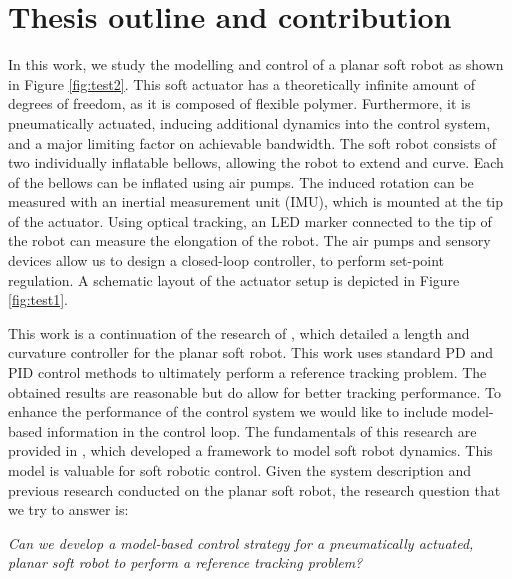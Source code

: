 \section*{Thesis outline and contribution}

In this work, we study the modelling and control of a planar soft robot as shown in Figure \ref{fig:test2}. This soft actuator has a theoretically infinite amount of degrees of freedom, as it is composed of flexible polymer. Furthermore, it is pneumatically actuated, inducing additional dynamics into the control system, and a major limiting factor on achievable bandwidth. The soft robot consists of two individually inflatable bellows, allowing the robot to extend and curve. Each of the bellows can be inflated using air pumps. The induced rotation can be measured with an inertial measurement unit (IMU), which is mounted at the tip of the actuator. Using optical tracking, an LED marker connected to the tip of the robot can measure the elongation of the robot. The air pumps and sensory devices allow us to design a closed-loop controller, to perform set-point regulation. A schematic layout of the actuator setup is depicted in Figure \ref{fig:test1}.

This work is a continuation of the research of \cite{berkers}, which detailed a length and curvature controller for the planar soft robot. This work uses standard PD and PID control methods to ultimately perform a reference tracking problem. The obtained results are reasonable but do allow for better tracking performance. To enhance the performance of the control system we would like to include model-based information in the control loop. The fundamentals of this research are provided in \cite{Caasenbrood2020}, which developed a framework to model soft robot dynamics. This model is valuable for soft robotic control. Given the system description and previous research conducted on the planar soft robot, the research question that we try to answer is:

\textit{Can we develop a model-based control strategy for a pneumatically actuated, planar soft robot to perform a reference tracking problem?}



